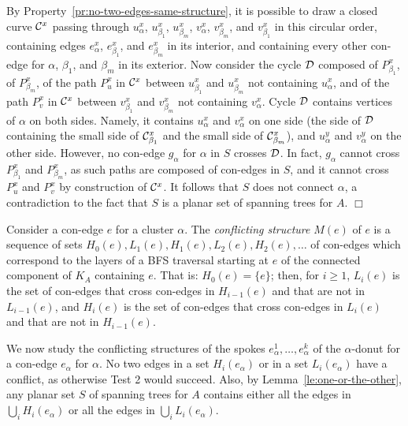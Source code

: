 \documentclass[letter,runningheads]{llncs}
\renewenvironment{proof}
{{\em Proof.\ }}{\hspace*{\fill}$\Box$\par\vspace{2mm}}
\begin{document}
\begin{proof}
By Property~\ref{pr:no-two-edges-same-structure}, it is possible to draw a closed curve ${\cal C}^x$ passing through $u^x_\alpha$, $u^x_{\beta_1}$, $u^x_{\beta_m}$, $v^x_\alpha$, $v^x_{\beta_m}$, and $v^x_{\beta_1}$ in this circular order, containing edges $e^x_\alpha$, $e^x_{\beta_1}$, and $e^x_{\beta_m}$ in its interior, and containing every other con-edge for $\alpha$, $\beta_1$, and $\beta_m$ in its exterior. Now consider the cycle ${\cal D}$ composed of $P^x_{\beta_1}$, of $P^x_{\beta_m}$, of the path $P^x_u$ in ${\cal C}^x$ between $u^x_{\beta_1}$ and $u^x_{\beta_m}$ not containing $u^x_{\alpha}$, and of the path $P^x_v$ in ${\cal C}^x$ between $v^x_{\beta_1}$ and $v^x_{\beta_m}$ not containing $v^x_{\alpha}$. Cycle ${\cal D}$ contains vertices of $\alpha$ on both sides. Namely, it contains $u^x_{\alpha}$ and $v^x_{\alpha}$ on one side (the side of ${\cal D}$ containing the small side of ${\cal C}^x_{\beta_1}$ and the small side of ${\cal C}^x_{\beta_m}$), and $u^y_{\alpha}$ and $v^y_{\alpha}$ on the other side. However, no con-edge $g_{\alpha}$ for $\alpha$ in $S$ crosses ${\cal D}$. In fact, $g_{\alpha}$ cannot cross $P^x_{\beta_1}$ and $P^x_{\beta_m}$, as such paths are composed of con-edges in $S$, and it cannot cross $P^x_u$ and $P^x_v$ by construction of ${\cal C}^x$. It follows that $S$ does not connect $\alpha$, a contradiction to the fact that $S$ is a planar set of spanning trees for $A$.
\end{proof}


Consider a con-edge $e$ for a cluster $\alpha$. The {\em conflicting structure} $M(e)$ of $e$ is a sequence of sets $H_0(e), L_1(e), H_1(e), L_2(e), H_2(e), \dots$ of con-edges which correspond to the layers of a BFS traversal starting at $e$ of the connected component of $K_A$ containing $e$. That is: $H_0(e)=\{e\}$; then, for $i\geq 1$, $L_i(e)$ is the set of con-edges that cross con-edges in $H_{i-1}(e)$ and that are not in $L_{i-1}(e)$, and $H_i(e)$ is the set of con-edges that cross con-edges in $L_{i}(e)$ and that are not in $H_{i-1}(e)$.

We now study the conflicting structures of the spokes $e^1_\alpha,\dots,e^{k}_\alpha$ of the $\alpha$-donut for a con-edge $e_{\alpha}$ for $\alpha$. No two edges in a set $H_i(e_{\alpha})$ or in a set $L_i(e_{\alpha})$ have a conflict, as otherwise {\sc Test 2} would succeed. Also, by Lemma~\ref{le:one-or-the-other}, any planar set $S$ of spanning trees for $A$ contains either all the edges in $\bigcup_i H_i(e_{\alpha})$ or all the edges in $\bigcup_i L_i(e_{\alpha})$.
\end{document}
